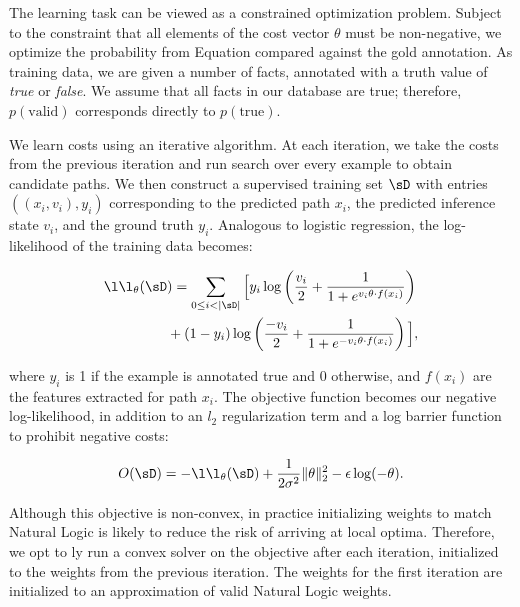 The learning task can be viewed as a constrained optimization problem.
Subject to the constraint that all elements of the cost vector $\theta$ 
  must be non-negative, we optimize the probability from
  Equation  compared against the gold annotation.
As training data, we are given a number of facts, annotated with a
  truth value of \textit{true} or \textit{false}.
We assume that all facts in our database are true; therefore,
  $p(\textrm{valid})$ corresponds directly to $p(\textrm{true})$.

We learn costs using an iterative algorithm.
At each iteration, we take the costs from the previous iteration
  and run search over every example to obtain candidate paths.
We then construct a supervised training set $\sD$ with entries
  $((x_i, v_i), y_i)$ corresponding to the predicted path $x_i$,
  the predicted inference state $v_i$, and the ground truth $y_i$.
Analogous to logistic regression,
  the log-likelihood of the training data becomes:

\vspace{-0.5em}
\begin{align*}
\l\l_\theta(\sD&) = \sum_{0 \leq i < |\sD|} \Big[
    y_i \log \left(\frac{v_i}{2} + \frac{1}{1 + e^{v_i \theta \cdot f(x_i)}} \right) \\
    &+ (1 - y_i) \log \left(\frac{-v_i}{2} + \frac{1}{1 + e^{-v_i \theta \cdot f(x_i)}} \right)
  \Big],
\end{align*}
\vspace{-0.5em}

\noindent where $y_i$ is 1 if the example is annotated true and 0
  otherwise, and $f(x_i)$ are the features extracted for path $x_i$.
The objective function becomes our negative log-likelihood, in addition
  to an $l_2$ regularization term and a log barrier function to 
  prohibit negative costs:
\vspace{-0.5em}

\begin{equation*}
O(\sD) = -\l\l_\theta(\sD) 
  + \frac{1}{2 \sigma^2}\|\theta\|_2^2
  - \epsilon \log(-\theta).
\end{equation*}
\vspace{-0.5em}

Although this objective is non-convex, in practice initializing weights
  to match Natural Logic is likely to reduce the risk of arriving at
  local optima.
Therefore, we opt to \naive ly run a convex solver on the objective after
  each iteration, initialized to the weights from the previous
  iteration.
The weights for the first iteration are initialized to an approximation
  of valid Natural Logic weights.


